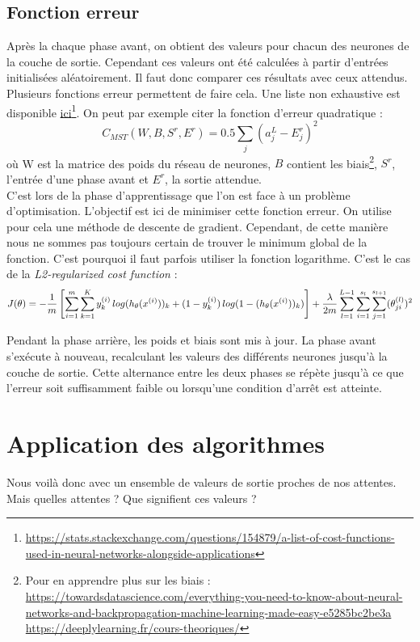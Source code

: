 \subsection{Fonction erreur}
	Après la chaque phase avant, on obtient des valeurs pour chacun des neurones de la couche de sortie. Cependant ces valeurs ont été calculées à partir d'entrées initialisées aléatoirement. Il faut donc comparer ces résultats avec ceux attendus. Plusieurs fonctions erreur permettent de faire cela. Une liste non exhaustive est disponible \href{https://stats.stackexchange.com/questions/154879/a-list-of-cost-functions-used-in-neural-networks-alongside-applications}{ici}\footnote{\url{https://stats.stackexchange.com/questions/154879/a-list-of-cost-functions-used-in-neural-networks-alongside-applications}}. On peut par exemple citer la fonction d'erreur quadratique : 
	$$C_{MST}(W, B, S^r, E^r) = 0.5\sum\limits_j (a^L_j - E^r_j)^2$$
	où W est la matrice des poids du réseau de neurones, $B$ contient les biais\footnote{Pour en apprendre plus sur les biais : \\ \url{https://towardsdatascience.com/everything-you-need-to-know-about-neural-networks-and-backpropagation-machine-learning-made-easy-e5285bc2be3a}\\\url{https://deeplylearning.fr/cours-theoriques/}}, $S^r$, l'entrée d'une phase avant et $E^r$, la sortie attendue.\\
	
	C'est lors de la phase d'apprentissage que l'on est face à un problème d'optimisation. L'objectif est ici de minimiser cette fonction erreur. On utilise pour cela une méthode de descente de gradient. Cependant, de cette manière nous ne sommes pas toujours certain de trouver le minimum global de la fonction. C'est pourquoi il faut parfois utiliser la fonction logarithme. C'est le cas de la \textit{L2-regularized cost function} :
	$$J(\theta) = -{1 \over m} \left[ \sum_{i=1}^m \sum_{k=1}^K y_k^{(i)}\,log(h_\theta(x^{(i)}))_k + (1-y_k^{(i)})\,log(1 - (h_\theta(x^{(i)}))_k) \right] + {\lambda \over 2m } \sum_{l=1}^{L-1} \sum_{i=1}^{s_l} \sum_{j=1}^{s_{l+1}} (\theta_{ji}^{(l)})^2$$

	Pendant la phase arrière, les poids et biais sont mis à jour. La phase avant s'exécute à nouveau, recalculant les valeurs des différents neurones jusqu'à la couche de sortie. Cette alternance entre les deux phases se répète jusqu'à ce que l'erreur soit suffisamment faible ou lorsqu'une condition d'arrêt est atteinte.	
	
\section{Application des algorithmes}
	Nous voilà donc avec un ensemble de valeurs de sortie proches de nos attentes. Mais quelles attentes ? Que signifient ces valeurs ? \\
	
